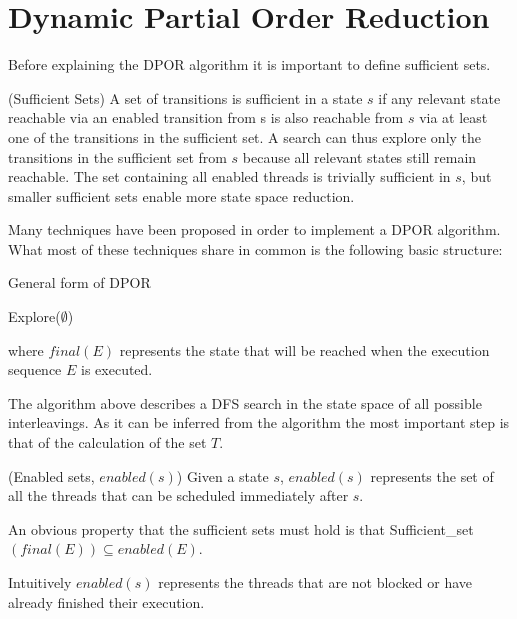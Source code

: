 \section{Dynamic Partial Order Reduction}

Before explaining the DPOR algorithm it is important to define sufficient sets.

\begin{definition}{(Sufficient Sets)}
A set of transitions is sufficient in a state $s$ if any relevant
state reachable via an enabled transition from s is also reachable from $s$ via at least one of the transitions in the sufficient
set. A search can thus explore only the transitions in the
sufficient set from $s$ because all relevant states still remain
reachable. The set containing all enabled threads is trivially
sufficient in $s$, but smaller sufficient sets enable more state
space reduction.
\end{definition}

Many techniques have been proposed in order to implement a DPOR algorithm. What most of these techniques share in common is the following basic structure:

\begin{algorithm}[H]
    \caption{General form of DPOR}
    Explore($\emptyset$)\;
\end{algorithm}

where $final(E)$ represents the state that will be reached when the execution sequence $E$ is executed.

The algorithm above describes a DFS search in the state space of all possible interleavings.
As it can be inferred from the algorithm the most important step is that of the calculation of the set $T$.

\begin{definition}{(Enabled sets, $enabled(s)$)}
    Given a state $s$, $enabled(s)$ represents the set of all the threads that can be scheduled immediately after $s$.
\end{definition}

An obvious property that the sufficient sets must hold is that Sufficient\_set$(final(E)) \subseteq enabled(E)$.

Intuitively $enabled(s)$ represents the threads that are not blocked or have already finished their execution.

